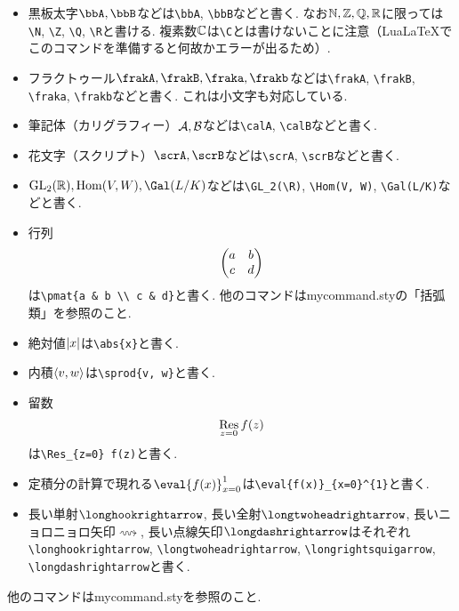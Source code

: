 \documentclass[11pt,a4paper,oneside,lualatex]{ltjsarticle} %
\numberwithin{equation}{section} %
\begin{document}
\begin{itemize}
	\item 黒板太字$ \bbA, \bbB $などは\verb|\bbA|, \verb|\bbB|などと書く. 
	なお$ \mathbb{N}, \mathbb{Z}, \mathbb{Q}, \mathbb{R} $に限っては\verb|\N|, \verb|\Z|, \verb|\Q|, \verb|\R|と書ける. 
	複素数$ \mathbb{C} $は\verb|\C|とは書けないことに注意（LuaLaTeXでこのコマンドを準備すると何故かエラーが出るため）. 
	
	\item フラクトゥール$ \frakA, \frakB, \fraka, \frakb $などは\verb|\frakA|, \verb|\frakB|, \verb|\fraka|, \verb|\frakb|などと書く. これは小文字も対応している. 
	
	\item 筆記体（カリグラフィー）$ \mathcal{A}, \mathcal{B} $などは\verb|\calA|, \verb|\calB|などと書く. 
	
	\item 花文字（スクリプト）$ \scrA, \scrB $などは\verb|\scrA|, \verb|\scrB|などと書く. 
	
	\item $ \GL_2(\R), \Hom(V, W), \Gal(L/K) $などは\verb|\GL_2(\R)|, \verb|\Hom(V, W)|, \verb|\Gal(L/K)|などと書く. 
	
	\item 行列
	\[
	\begin{pmatrix}a & b \\ c & d\end{pmatrix}
	\]
	は\verb|\pmat{a & b \\ c & d}|と書く. 
	他のコマンドはmycommand.styの「括弧類」を参照のこと. 
	
	\item 絶対値$ \left\lvert x\right\rvert $は\verb|\abs{x}|と書く. 
	
	\item 内積$ \left\langle v, w\right\rangle $は\verb|\sprod{v, w}|と書く. 
	
	\item 留数
	\[
	\operatorname*{Res}_{z=0} f(z)
	\]
	は\verb|\Res_{z=0} f(z)|と書く. 
	
	\item 定積分の計算で現れる$ \eval{f(x)}_{x=0}^{1} $は\verb|\eval{f(x)}_{x=0}^{1}|と書く. 
	
	\item 長い単射$ \longhookrightarrow $, 長い全射$ \longtwoheadrightarrow $, 長いニョロニョロ矢印$ \longrightsquigarrow $, 長い点線矢印$ \longdashrightarrow $はそれぞれ\verb|\longhookrightarrow|, \verb|\longtwoheadrightarrow|, \verb|\longrightsquigarrow|, \verb|\longdashrightarrow|と書く.
\end{itemize}


他のコマンドはmycommand.styを参照のこと. 


\end{document}

